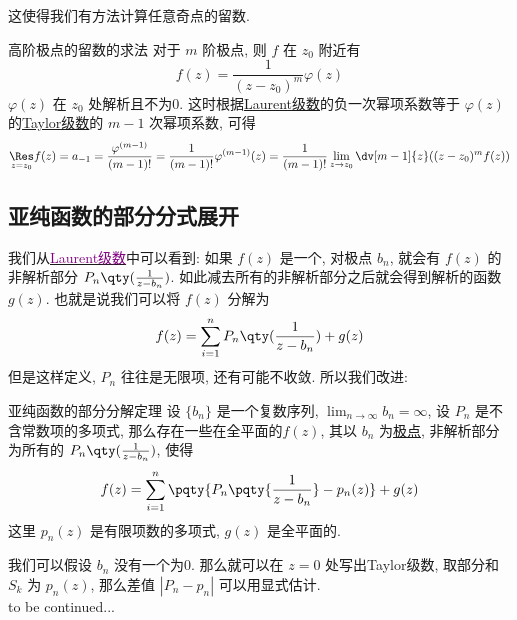 \documentclass[UTF8]{ctexart}
\newcommand{\hyperrefc}[2]{\hyperref[#1]{\textcolor{purple}{#2}}}
\newcommand{\continued}{{\Large to be continued...}}
\begin{document}
        这使得我们有方法计算任意奇点的留数. 

        \begin{crl}
            {高阶极点的留数的求法}
            对于 \(m\) 阶极点, 则 \(f\) 在 \(z_0\) 附近有
            \[f(z)=\frac{1}{(z-z_0)^m}\varphi(z)\]
            \(\varphi(z)\) 在 \(z_0\) 处解析且不为0. 这时根据\hyperref[thm:Laurent]{Laurent级数}的负一次幂项系数等于 \(\varphi(z)\) 的\hyperref[thm:TaylorSeries]{Taylor级数}的 \(m-1\) 次幂项系数, 可得
            \[\underset{z=z_0}{\Res}f(z)=a_{-1}=\frac{\varphi^{(m-1)}}{(m-1)!}=\frac{1}{(m-1)!}\varphi^{(m-1)}(z)=\frac{1}{(m-1)!}\lim_{z\to z_0}\dv[m-1]{z}((z-z_0)^mf(z))\]
        \end{crl}
    
    \subsection{亚纯函数的部分分式展开}

        我们从\hyperrefc{thm:Laurent}{Laurent级数}中可以看到: 如果 \(f(z)\) 是一个\MeromorphicFunction, 对极点 \(b_n\), 就会有 \(f(z)\) 的非解析部分 \(P_n\qty(\frac{1}{z-b_n})\). 如此减去所有的非解析部分之后就会得到解析的函数 \(g(z)\). 也就是说我们可以将 \(f(z)\) 分解为
        \[f(z)=\sum_{i=1}^{n}P_n\qty(\frac{1}{z-b_n})+g(z)\]
        但是这样定义,  \(P_n\) 往往是无限项, 还有可能不收敛. 所以我们改进: 

        \begin{thm}
            {亚纯函数的部分分解定理}
            设 \(\{b_n\}\) 是一个复数序列,  \(\lim_{n\to\infty }b_n=\infty\), 设 \(P_n\) 是不含常数项的多项式, 那么存在一些在全平面的\MeromorphicFunction  \(f(z)\), 其以 \(b_n\) 为\hyperref[dfn:PolarSingularity]{极点}, 非解析部分为所有的 \(P_n\qty(\frac{1}{z-b_n})\), 使得
            \[f(z)=\sum_{i=1}^{n}\pqty{P_n\pqty{\frac{1}{z-b_n}}-p_n(z)}+g(z)\]
            这里 \(p_n(z)\) 是有限项数的多项式,  \(g(z)\) 是全平面的. 
        \end{thm}

        \begin{prf}
            我们可以假设 \(b_n\) 没有一个为0. 那么就可以在 \(z=0\) 处写出Taylor级数, 取部分和 \(S_k\) 为 \(p_n(z)\), 那么差值 \(|P_n-p_n|\) 可以用 显式估计. \\
            \continued
        \end{prf}
\end{document}
